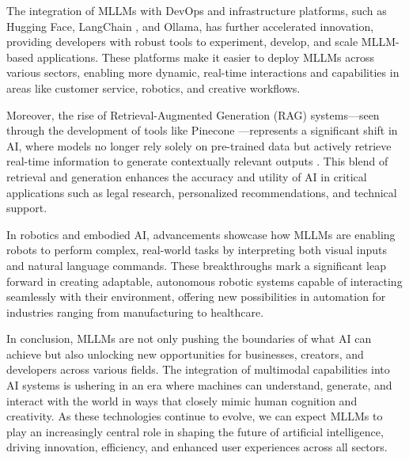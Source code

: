 The integration of MLLMs with DevOps and infrastructure platforms, such as Hugging Face, LangChain \cite{chase2022langchain}, and Ollama, has further accelerated innovation, providing developers with robust tools to experiment, develop, and scale MLLM-based applications. These platforms make it easier to deploy MLLMs across various sectors, enabling more dynamic, real-time interactions and capabilities in areas like customer service, robotics, and creative workflows.

Moreover, the rise of Retrieval-Augmented Generation (RAG) systems—seen through the development of tools like Pinecone \cite{johnson2021pinecone}—represents a significant shift in AI, where models no longer rely solely on pre-trained data but actively retrieve real-time information to generate contextually relevant outputs \cite{lewis2020retrieval}. This blend of retrieval and generation enhances the accuracy and utility of AI in critical applications such as legal research, personalized recommendations, and technical support.

In robotics and embodied AI, advancements showcase how MLLMs are enabling robots to perform complex, real-world tasks by interpreting both visual inputs and natural language commands. These breakthroughs mark a significant leap forward in creating adaptable, autonomous robotic systems capable of interacting seamlessly with their environment, offering new possibilities in automation for industries ranging from manufacturing to healthcare.

In conclusion, MLLMs are not only pushing the boundaries of what AI can achieve but also unlocking new opportunities for businesses, creators, and developers across various fields. The integration of multimodal capabilities into AI systems is ushering in an era where machines can understand, generate, and interact with the world in ways that closely mimic human cognition and creativity. As these technologies continue to evolve, we can expect MLLMs to play an increasingly central role in shaping the future of artificial intelligence, driving innovation, efficiency, and enhanced user experiences across all sectors.



